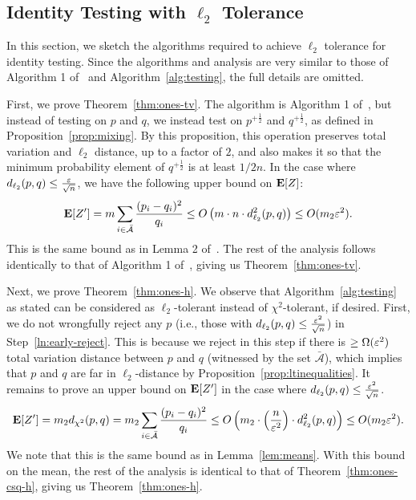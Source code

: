 \subsection{Identity Testing with $\ell_2$ Tolerance}
\label{sec:id-lt}
In this section, we sketch the algorithms required to achieve $\ell_2$ tolerance for identity testing.
Since the algorithms and analysis are very similar to those of Algorithm 1 of~\cite{AcharyaDK15} and Algorithm~\ref{alg:testing}, the full details are omitted.

First, we prove Theorem~\ref{thm:ones-tv}.
The algorithm is Algorithm 1 of~\cite{AcharyaDK15}, but instead of testing on $p$ and $q$, we instead test on $p^{+\frac12}$ and $q^{+\frac12}$, as defined in Proposition~\ref{prop:mixing}.
By this proposition, this operation preserves total variation and $\ell_2$ distance, up to a factor of $2$, and also makes it so that the minimum probability element of $q^{+\frac12}$ is at least $1/2n$. 
In the case where $d_{\ell_2}(p,q) \leq \frac{\varepsilon}{\sqrt{n}}$, we have the following upper bound on $\mbox{\bf E}[Z]$:
$$\mbox{\bf E}[Z'] = m \sum_{i \in \mathcal{\bar A}} \frac{(p_i - q_i)^2}{q_i} \leq O\left( m \cdot n \cdot d_{\ell_2}^2(p,q)\right) \leq O(m_2 \varepsilon^2).$$
This is the same bound as in Lemma 2 of~\cite{AcharyaDK15}.
The rest of the analysis follows identically to that of Algorithm 1 of~\cite{AcharyaDK15}, giving us Theorem~\ref{thm:ones-tv}.

Next, we prove Theorem~\ref{thm:ones-h}.
We observe that Algorithm~\ref{alg:testing} as stated can be considered as $\ell_2$-tolerant instead of $\chi^2$-tolerant, if desired.
First, we do not wrongfully reject any $p$ (i.e., those with $d_{\ell_2}(p,q) \leq \frac{\varepsilon^2}{\sqrt{n}}$) in Step~\ref{ln:early-reject}.
This is because we reject in this step if there is $\geq \Omega(\varepsilon^2)$ total variation distance between $p$ and $q$ (witnessed by the set $\mathcal{\bar A}$), which implies that $p$ and $q$ are far in $\ell_2$-distance by Proposition~\ref{prop:ltinequalities}.
It remains to prove an upper bound on $\mbox{\bf E}[Z']$ in the case where $d_{\ell_2}(p,q) \leq \frac{\varepsilon^2}{\sqrt{n}}$.
$$\mbox{\bf E}[Z'] = m_2 d_{\chi^2}(p,q) = m_2 \sum_{i \in \mathcal{\bar A}} \frac{(p_i - q_i)^2}{q_i} \leq O\left( m_2 \cdot \left(\frac{n}{\varepsilon^2}\right)\cdot d_{\ell_2}^2(p,q)\right) \leq O(m_2 \varepsilon^2).$$
We note that this is the same bound as in Lemma~\ref{lem:means}.
With this bound on the mean, the rest of the analysis is identical to that of Theorem~\ref{thm:ones-csq-h}, giving us Theorem~\ref{thm:ones-h}.
